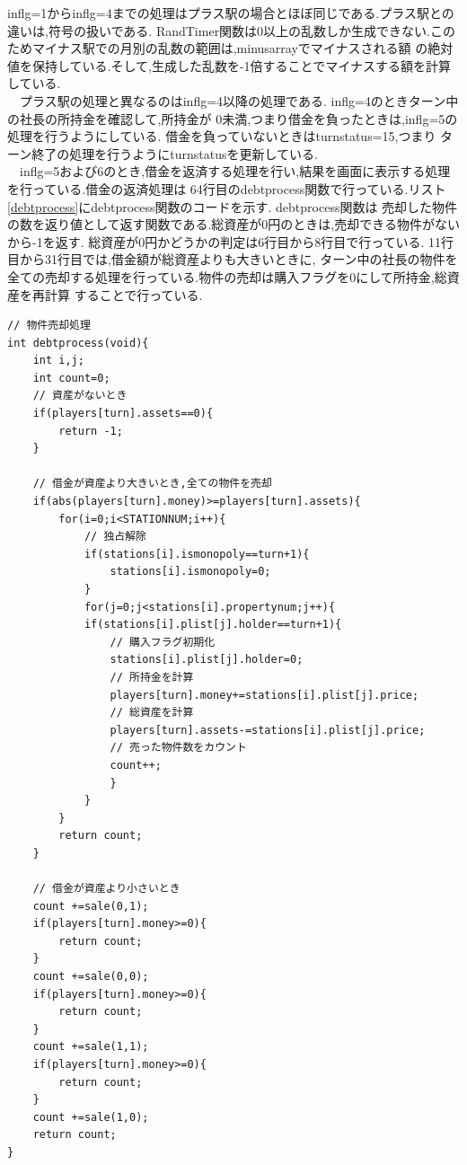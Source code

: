 \documentclass[a4j]{jarticle}
\begin{document}
        inflg=1からinflg=4までの処理はプラス駅の場合とほぼ同じである.プラス駅との違いは,符号の扱いである.
        RandTimer関数は0以上の乱数しか生成できない.このためマイナス駅での月別の乱数の範囲は,minusarrayでマイナスされる額
        の絶対値を保持している.そして,生成した乱数を-1倍することでマイナスする額を計算している.\\
        　プラス駅の処理と異なるのはinflg=4以降の処理である. inflg=4のときターン中の社長の所持金を確認して,所持金が
        0未満,つまり借金を負ったときは,inflg=5の処理を行うようにしている. 借金を負っていないときはturnstatus=15,つまり
        ターン終了の処理を行うようにturnstatusを更新している.\\
        　inflg=5および6のとき,借金を返済する処理を行い,結果を画面に表示する処理を行っている.借金の返済処理は
        64行目のdebtprocess関数で行っている.リスト\ref{debtprocess}にdebtprocess関数のコードを示す. debtprocess関数は
        売却した物件の数を返り値として返す関数である.総資産が0円のときは,売却できる物件がないから-1を返す.
        総資産が0円かどうかの判定は6行目から8行目で行っている. 11行目から31行目では,借金額が総資産よりも大きいときに,
        ターン中の社長の物件を全ての売却する処理を行っている.物件の売却は購入フラグを0にして所持金,総資産を再計算
        することで行っている. 
        \begin{lstlisting}[basicstyle=\ttfamily\footnotesize, frame=single,label=debtprocess,caption=debtprocess関数]
// 物件売却処理
int debtprocess(void){
    int i,j;
    int count=0;
    // 資産がないとき
    if(players[turn].assets==0){
        return -1;
    }

    // 借金が資産より大きいとき,全ての物件を売却
    if(abs(players[turn].money)>=players[turn].assets){
        for(i=0;i<STATIONNUM;i++){
            // 独占解除
            if(stations[i].ismonopoly==turn+1){
                stations[i].ismonopoly=0;
            }
            for(j=0;j<stations[i].propertynum;j++){
            if(stations[i].plist[j].holder==turn+1){
                // 購入フラグ初期化
                stations[i].plist[j].holder=0;
                // 所持金を計算
                players[turn].money+=stations[i].plist[j].price;
                // 総資産を計算
                players[turn].assets-=stations[i].plist[j].price;
                // 売った物件数をカウント
                count++;
                }
            }
        }  
        return count;
    }

    // 借金が資産より小さいとき
    count +=sale(0,1);
    if(players[turn].money>=0){
        return count;
    }
    count +=sale(0,0);
    if(players[turn].money>=0){
        return count;
    }
    count +=sale(1,1);
    if(players[turn].money>=0){
        return count;
    }
    count +=sale(1,0);
    return count;
}
        \end{lstlisting}
\end{document}
